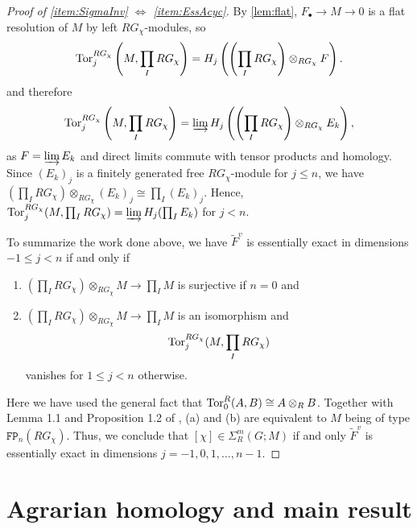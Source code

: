 \documentclass[11pt, letterpaper]{amsart}
\begin{document}
\begin{proof}[Proof of \ref{item:SigmaInv} $\Longleftrightarrow$ \ref{item:EssAcyc}]
By \cref{lem:flat},  $F_\bullet \longrightarrow M \longrightarrow 0$ is a flat resolution of $M$ by left $RG_\chi$-modules, so 
\[
    \operatorname{Tor}^{RG_\chi}_j \left(M, \prod_I RG_\chi \right) = H_j\left( \left(\prod_I RG_\chi \right) \otimes_{RG_\chi} F \right).
\]
and therefore
\[
    \operatorname{Tor}^{RG_\chi}_j \left(M, \prod_I RG_\chi \right) = \varinjlim H_j \left( \left(\prod_I RG_\chi \right) \otimes_{RG_\chi} E_k \right),
\]
as $F = \varinjlim E_k$ and direct limits commute with tensor products and homology. Since $(E_k)_j$ is a finitely generated free $RG_\chi$-module for $j \leqslant n$, we have $\left(\prod_I RG_\chi \right) \otimes_{RG_\chi} (E_k)_j \cong \prod_I (E_k)_j$. Hence, $\operatorname{Tor}_j^{RG_\chi}(M, \prod_I RG_\chi) = \varinjlim H_j(\prod_I E_k)$ for $j < n$.

To summarize the work done above, we have $\widetilde{F}^v$ is essentially exact in dimensions $-1 \leqslant j < n$ if and only if
\begin{enumerate}[label=(\alph*)]
    \item $(\prod_I RG_\chi) \otimes_{RG_\chi} M \longrightarrow \prod_I M$ is surjective if $n = 0$ and
    \item $(\prod_I RG_\chi) \otimes_{RG_\chi} M \longrightarrow \prod_I M$ is an isomorphism and 
    \[
        \operatorname{Tor}_j^{RG_\chi}(M, \prod_I RG_\chi)
    \]
    vanishes for $1 \leqslant j < n$ otherwise.
\end{enumerate}
Here we have used the general fact that $\operatorname{Tor}_0^R(A,B) \cong A \otimes_R B$. Together with Lemma 1.1 and Proposition 1.2 of \cite{BieriEckmannFinProps}, (a) and (b) are equivalent to $M$ being of type $\mathtt{FP}_n(RG_\chi)$. Thus, we conclude that $[\chi] \in \Sigma^m_R(G;M)$ if and only $\widetilde{F}^v$ is essentially exact in dimensions $j = -1, 0, 1, \dots, n-1$. \qedhere
\end{proof}




\section{Agrarian homology and main result} \label{sec:homology}
\end{document}
